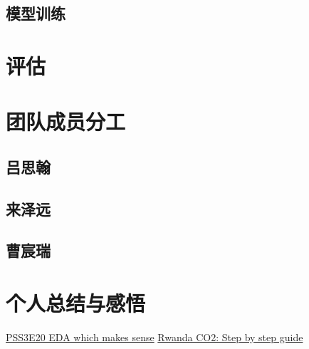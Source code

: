 \documentclass[fontset=windows]{article}
\begin{document}
\subsection{模型训练}

\section{评估}

\section{团队成员分工}

\subsection{吕思翰}

\subsection{来泽远}

\subsection{曹宸瑞}

\section{个人总结与感悟}

\begin{thebibliography}{100}  
\href{https://www.kaggle.com/code/ambrosm/pss3e20-eda-which-makes-sense}{PSS3E20 EDA which makes sense}
\href{https://www.kaggle.com/code/kacperrabczewski/rwanda-co2-step-by-step-guide}{Rwanda CO2: Step by step guide}
\end{thebibliography}
\end{document}

